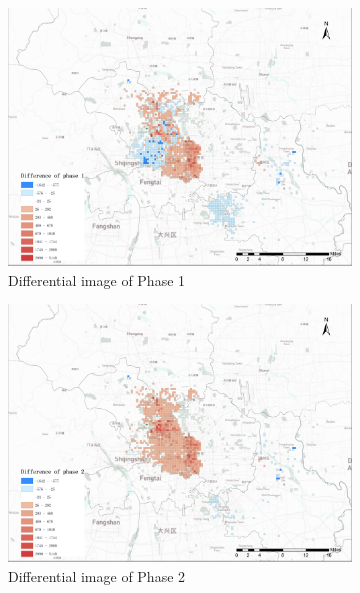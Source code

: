 \documentclass[preprints,ijgi,submit,moreauthors]{Definitions/mdpi}
\begin{document}
\begin{figure}[H]
    \begin{subfigure}{.3\textwidth}
        \includegraphics[width=\textwidth]{Figures/dif_p1.png}
        \caption{Differential image of Phase 1}
    \end{subfigure}
        \begin{subfigure}{.3\textwidth}
        \includegraphics[width=\textwidth]{Figures/dif_p2.png}
        \caption{Differential image of Phase 2}
    \end{subfigure}
        \begin{subfigure}{.3\textwidth}

\end{subfigure}
\end{figure}
\end{document}
